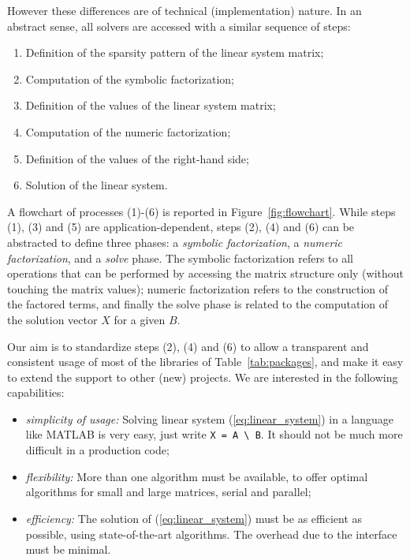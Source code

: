 \documentclass[acmtocl]{acmtrans2m}
\begin{document}
However these differences are of technical (implementation) nature. In
an abstract sense, all solvers are accessed with a similar sequence of
steps:
\begin{enumerate}
\item Definition of the sparsity pattern of the linear system matrix;
\item Computation of the symbolic factorization;
\item Definition of the values of the linear system matrix;
\item Computation of the numeric factorization;
\item Definition of the values of the right-hand side;
\item Solution of the linear system.
\end{enumerate}
A flowchart of processes (1)-(6) is reported in Figure~\ref{fig:flowchart}.
While steps (1), (3) and (5) are application-dependent, steps (2), (4) and
(6) can be abstracted to define three phases: a {\sl symbolic
factorization}, a {\sl numeric factorization}, and a {\sl solve} phase. The
symbolic factorization refers to all operations that can be performed by
accessing the matrix structure only (without touching the matrix values);
numeric factorization refers to the construction of the factored terms, and
finally the solve phase is related to the computation of the solution vector
$X$ for a given $B$.

Our aim is to standardize steps (2), (4)
and (6) to allow a transparent and consistent usage
of most of the libraries of Table~\ref{tab:packages}, and make it easy
to extend the support to other (new) projects. We are interested in the
following capabilities:
\begin{itemize}

\item {\sl simplicity of usage:} Solving linear system (\ref{eq:linear_system}) in a language
like MATLAB is very easy, just write \verb!X = A \ B!. It should not be much
more difficult in a production code;

\item {\sl flexibility:} More than one algorithm must be available,
  to offer optimal algorithms for small and large matrices, serial and
  parallel;

\item {\sl efficiency:} The solution of (\ref{eq:linear_system}) must be as
efficient as possible, using state-of-the-art algorithms. The
overhead due to the interface must be minimal.
\end{itemize}
\end{document}
